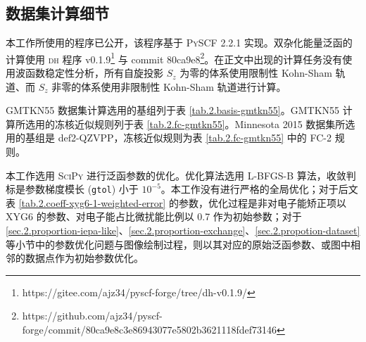 \subsection{数据集计算细节}

本工作所使用的程序已公开\cite{dh.ajz34}，该程序基于 \textsc{PySCF} 2.2.1 实现\cite{Sun-Chan.WCMS.2018, Sun-Chan.JCP.2020}。双杂化能量泛函的计算使用 \textsc{dh} 程序 v0.1.9\footnote{https://gitee.com/ajz34/pyscf-forge/tree/dh-v0.1.9/} 与 commit 80ca9e8\footnote{https://github.com/ajz34/pyscf-forge/commit/80ca9e8c3e86943077e5802b3621118fdef73146}。在正文中出现的计算任务没有使用波函数稳定性分析，所有自旋投影 $S_z$ 为零的体系使用限制性 Kohn-Sham 轨道、而 $S_z$ 非零的体系使用非限制性 Kohn-Sham 轨道进行计算。

GMTKN55 数据集计算选用的基组列于表 \ref{tab.2.basis-gmtkn55}。GMTKN55 计算所选用的冻核近似规则列于表 \ref{tab.2.fc-gmtkn55}。Minnesota 2015 数据集所选用的基组是 def2-QZVPP，冻核近似规则为表 \ref{tab.2.fc-gmtkn55} 中的 FC-2 规则。

本工作选用 \textsc{SciPy}\cite{Virtanen-Vazquez-Baeza.NM.2020} 进行泛函参数的优化。优化算法选用 L-BFGS-B 算法\cite{Byrd-Zhu.SJSC.1995}，收敛判标是参数梯度模长 (\verb|gtol|) 小于 $10^{-5}$。本工作没有进行严格的全局优化；对于后文表 \ref{tab.2.coeff-xyg6-1-weighted-error} 的参数，优化过程是非对电子能矫正项以 XYG6 的参数、对电子能占比微扰能比例以 0.7 作为初始参数；对于 \ref{sec.2.proportion-iepa-like}、\ref{sec.2.proportion-exchange}、\ref{sec.2.propotion-dataset} 等小节中的参数优化问题与图像绘制过程，则以其对应的原始泛函参数、或图中相邻的数据点作为初始参数优化。


